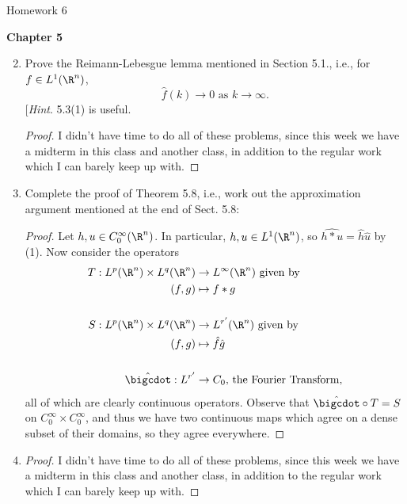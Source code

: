 \documentclass[12pt,letterpaper]{article}
\begin{document}
\pagestyle{fancy}
\begin{center}
{\Large Homework 6}%
\end{center}

\renewcommand{\B}{\bar{B}(\ell^\infty)}
\textbf{Chapter 5}

\begin{enumerate}
\setcounter{enumi}{1}
\item Prove the Reimann-Lebesgue lemma mentioned in Section 5.1., i.e., for $f\in L^1(\R^n)$, 
$$\hat{f}(k)\to 0\text{ as }k\to \infty.$$
[\textit{Hint}. 5.3(1) is useful. 
\begin{proof}
I didn't have time to do all of these problems, since this week we have a midterm in this class and another class, in addition to the regular work which I can barely keep up with. 
\end{proof}

\setcounter{enumi}{4}
\item Complete the proof of Theorem 5.8, i.e., work out the approximation
argument mentioned at the end of Sect. 5.8:

\begin{proof}
Let $h,u\in C^\infty_0(\R^n)$. In particular, $h,u\in L^1(\R^n)$, so $\widehat{h*u}=\hat h \hat u$ by (1). Now consider the operators 
\begin{align*}
T:L^p(\R^n)\times L^q(\R^n) &\to L^\infty(\R^n) \text{ given by}\\
 (f,g)&\mapsto f*g\\
 \\
S:L^p(\R^n)\times L^q(\R^n) &\to L^{r'}(\R^n) \text{ given by}\\
 (f,g)&\mapsto \hat f \hat g\\
 \\
\hat \bigcdot : L^{r'}&\to C_0 \text{, the Fourier Transform,}
\end{align*}
all of which are clearly continuous operators. Observe that $\hat \bigcdot \circ T = S$ on $C^\infty_0\times C^\infty_0$, and thus we have two continuous maps which agree on a dense subset of their domains, so they agree everywhere. 
\end{proof}

\item %
\mbox{}\vspace*{-28pt}
\begin{proof}
I didn't have time to do all of these problems, since this week we have a midterm in this class and another class, in addition to the regular work which I can barely keep up with. 
\end{proof}


\end{enumerate}
\end{document}

